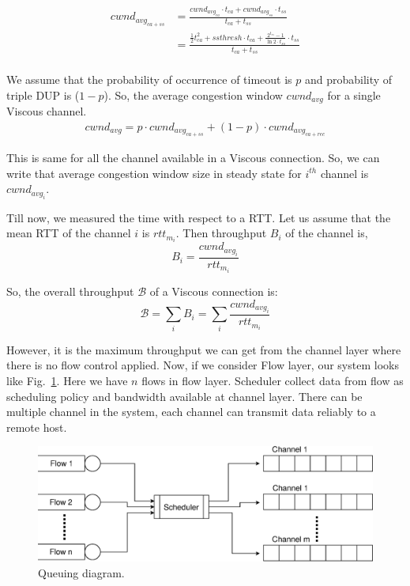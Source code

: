 \begin{equation}
\begin{split}
cwnd_{avg_{ca+ss}} &= \frac{cwnd_{avg_{ca}} \cdot t_{ca} + cwnd_{avg_{ss}} \cdot t_{ss}} {t_{ca} + t_{ss}} \\
&= \frac{\frac{1}{2} t_{ca}^2+ssthresh \cdot t_{ca} + \frac{2^{t_{ss}}-1}{\ln{2} \cdot t_{ss}} \cdot t_{ss}}{t_{ca} + t_{ss}} \\
\end{split}
\end{equation}


We assume that the probability of occurrence of timeout is $p$ and probability of triple DUP is ($1-p$). So, the average congestion window $cwnd_{avg}$ for a single Viscous channel.
\begin{equation}
\begin{split}
cwnd_{avg} = p \cdot cwnd_{avg_{ca+ss}} + (1-p) \cdot cwnd_{avg_{ca+rec}}
\end{split}
\end{equation}

This is same for all the channel available in a Viscous connection. So, we can write that average congestion window size in steady state for $i^{th}$ channel is $cwnd_{avg_i}$.

Till now, we measured the time with respect to a RTT. Let us assume that the mean RTT of the channel $i$ is $rtt_{m_i}$. Then throughput $B_i$ of the channel is, 
\begin{equation}
B_i = \frac{cwnd_{avg_i}}{rtt_{m_i}}
\end{equation}

So, the overall throughput $\mathcal{B}$ of a Viscous connection is:
$$ \mathcal{B} = \sum_{i}^{} B_i = \sum_{i}^{} \frac{cwnd_{avg_i}}{rtt_{m_i}} $$


However, it is the maximum throughput we can get from the channel layer where there is no flow control applied. Now, if we consider Flow layer, our system looks like Fig.~\ref{fig:sys_que}. Here we have $n$ flows in flow layer. Scheduler collect data from flow as scheduling policy and bandwidth available at channel layer. There can be multiple channel in the system, each channel can transmit data reliably to a remote host.

\begin{figure}[!h]
	\centering
	\includegraphics[width=\linewidth]{img/model/system_queue}
	\caption{Queuing diagram.}
	\label{fig:sys_que}
\end{figure}

